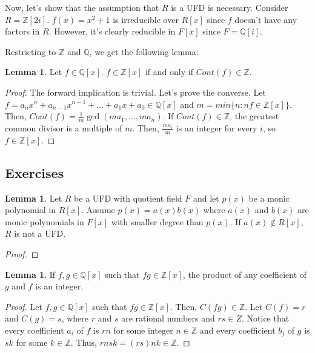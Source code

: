 \documentclass{article}
\theoremstyle{definition}
\newtheorem{lemma}[theorem]{Lemma}
\newcommand{\Z}{\mathbb{Z}}
\newcommand{\Q}{\mathbb{Q}}
\begin{document}
Now, let's show that the assumption that $R$ is a UFD is necessary. Consider $R = \Z[2i]$. $f(x) = x^{2} + 1$ is irreducible over $R[x]$ since $f$ doesn't have any factors in $R$. However, it's clearly reducible in $F[x]$ since $F = \Q[i]$.

Restricting to $\Z$ and $\Q$, we get the following lemma:

\begin{lemma}
    Let $f \in \mathbb{Q}[x]$. $f \in \mathbb{Z}[x]$ if and only if $Cont(f) \in \mathbb{Z}$.
\end{lemma}
\begin{proof}
    The forward implication is trivial. Let's prove the converse. Let $f = a_{n}x^{n} + a_{n-1}x^{n-1} + ... + a_{1}x + a_{0}\in \mathbb{Q}[x]$ and $m = min\{n : nf \in \mathbb{Z}[x]\}$. Then, $Cont(f) = \frac{1}{m} \gcd{(ma_{1},...,ma_{n})}$. If $Cont(f) \in \mathbb{Z}$, the greatest common divisor is a multiple of $m$. Then, $\frac{m a_{i}}{m}$ is an integer for every $i$, so $f \in \mathbb{Z}[x]$.
\end{proof}

\newpage

\subsection{Exercises}

\begin{lemma}
    Let $R$ be a UFD with quotient field $F$ and let $p(x)$ be a monic polynomial in $R[x]$. Assume $p(x) = a(x)b(x)$ where $a(x)$ and $b(x)$ are monic polynomials in $F[x]$ with smaller degree than $p(x)$. If $a(x) \notin R[x]$, $R$ is not a UFD.
\end{lemma}
\begin{proof}
    
\end{proof}

\begin{lemma}
    If $f,g \in \Q[x]$ such that $fg \in \Z[x]$, the product of any coefficient of $g$ and $f$ is an integer.
\end{lemma}
\begin{proof}
    Let $f,g \in \Q[x]$ such that $fg \in \Z[x]$. Then, $C(fg) \in \Z$. Let $C(f) = r$ and $C(g) = s$,
    where $r$ and $s$ are rational numbers and $rs \in Z$. Notice that every coefficient $a_{i}$ of $f$
    is $rn$ for some integer $n \in \Z$ and every coefficient $b_{j}$ of $g$ is $sk$ for some $k \in \Z$.
    Thus, $rnsk = (rs)nk \in \Z$. 
\end{proof}
\end{document}
